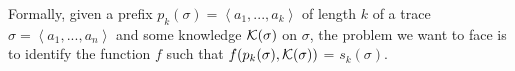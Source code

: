 

Formally, given a prefix $p_k(\sigma)=\left\langle a_1, ..., a_k\right\rangle$ of length $k$ of a trace $\sigma=\left\langle a_1, ..., a_n\right\rangle$ and some knowledge $\cal{K}(\sigma)$ on $\sigma$, the problem we want to face is to identify the function $f$ such that $f(p_k(\sigma), \cal{K}(\sigma))$ = $s_k(\sigma)$.
